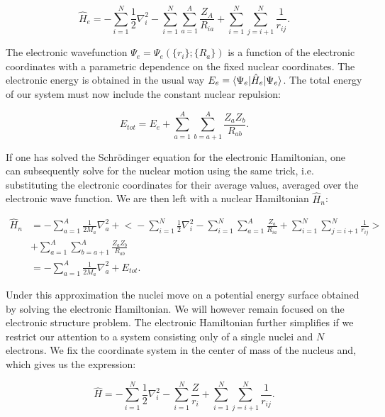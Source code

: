 \begin{equation}
    \hat{H}_e = -\sum_{i=1}^N \frac{1}{2} \nabla_i^2
    -\sum_{i=1}^N \sum_{a=1}^A \frac{Z_A}{R_{ia}}
    +\sum_{i=1}^N \sum_{j=i+1}^N \frac{1}{r_{ij}} .
\end{equation}

The electronic wavefunction $\Psi_e = \Psi_e(\{r_i\}; \{R_a\})$
is a function of the electronic coordinates with a parametric dependence
on the fixed nuclear coordinates. The electronic energy
is obtained in the usual way $E_{e} = \braket{\Psi_e | \hat{H}_e |
\Psi_e} $. The total energy of our system
must now include the constant nuclear repulsion:

\begin{equation}
 E_{tot} = E_{e} + \sum_{a=1}^A \sum_{b=a+1}^A
    \frac{Z_a Z_b}{R_{ab}} . 
\end{equation}

If one has solved the Schr\"{o}dinger equation for the electronic
Hamiltonian, one can subsequently solve for the nuclear motion
using the same trick, i.e. substituting the electronic coordinates
for their average values, averaged over the electronic wave function.
We are then left with a nuclear Hamiltonian $\hat{H}_n$:

\begin{equation}
    \begin{split}
        \hat{H}_n
        &= -\sum_{a=1}^A \frac{1}{2 M_a} \nabla_a^2
        + \biggl< -\sum_{i=1}^N \frac{1}{2} \nabla_i^2
        - \sum_{i=1}^N \sum_{a=1}^A \frac{Z_a}{R_{ia}}
        + \sum_{i=1}^N \sum_{j=i+1}^N \frac{1}{r_{ij}}
        \biggr> \\
        &+ \sum_{a=1}^A \sum_{b=a+1}^A
        \frac{Z_a Z_b}{R_{ab}} \\
        &= -\sum_{a=1}^A \frac{1}{2 M_a} \nabla_a^2
        + E_{tot} .
    \end{split}
\end{equation}

Under this approximation the nuclei move on a potential energy
surface obtained by solving the electronic Hamiltonian.
We will however remain focused on the electronic structure problem.
The electronic Hamiltonian further simplifies if we restrict our
attention to a system consisting only of a single nuclei
and $N$ electrons.
We fix the coordinate system in the center of mass of the nucleus
and, which gives us the expression:

\begin{equation}
    \hat{H} = -\sum_{i=1}^N \frac{1}{2} \nabla_i^2
    - \sum_{i=1}^N \frac{Z}{r_{i}} + \sum_{i=1}^N \sum_{j=i+1}^N
    \frac{1}{r_{ij}} .
\end{equation}

